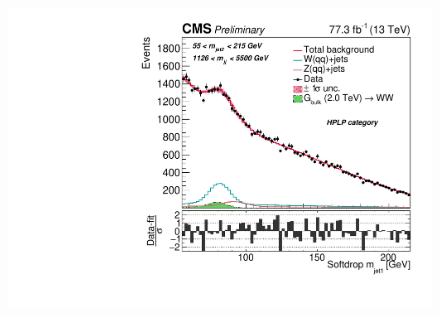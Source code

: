 \begin{figure}[h!]
\centering
\includegraphics{figures/analysis/search3/AN-17-303/postfitchecks/postfit_HPLP_unblind/PostFitComboHPLP_X-Proj__y___0_-1_z___0_-1.pdf}

\label{fig:summary}
\end{figure}